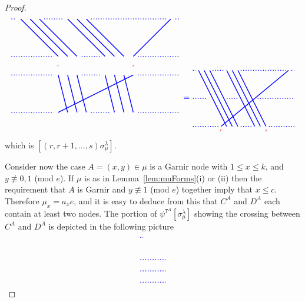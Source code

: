 \documentclass[twoside,11pt,reqno,letter]{amsart}
\numberwithin{equation}{section}
\theoremstyle{definition}  %
\newcommand{\0}{{\bar 0}}
\newcommand{\1}{{\bar 1}}
\newcommand{\la}{\lambda}
\newcommand{\si}{\sigma}
\def\T{{\mathtt T}}
\newenvironment{braid}{%
  \begin{tikzpicture}[baseline=6mm,blue,line width=1pt, scale=0.4,
                      draw/.append style={rounded corners},
                      every node/.append style={font=\tiny}]%
  }{\end{tikzpicture}
}
\begin{document}
{\begin{proof}
\[\begin{braid}
    \draw[dotted](0,10)--(0.5,10);
    \draw[dotted](0,6)--(4.5,6);
    \draw[dotted](0,4)--(4.5,4);
    \draw[dotted](0,0)--(4.5,0);

    \draw(1,10)--(5,6); \draw(5,5)node[color=red]{$r$}; \draw(5,4)--(6,0);
    \draw(2,10)--(6,6); \draw(6,4)--(7,0);
    \draw(3,10)--(7,6); \draw(7,4)--(8,0);

    \draw[dotted](3.5,10)--(5.5,10);
    \draw[dotted](7.5,6)--(9.5,6);
    \draw[dotted](7.5,4)--(9.5,4);
    \draw[dotted](8.5,0)--(10.5,0);

    \draw(6,10)--(10,6); \draw(10,4)--(11,0);
    \draw(7,10)--(11,6); \draw(11,4)--(12,0);
    \draw(8,10)--(12,6); \draw(12,4)--(13,0);

    \draw[dotted](8.5,10)--(16.5,10);

    \draw(17,10)--(13,6); \draw(13,5)node[color=red]{$s$}; \draw(13,4)--(5,0);

    \draw[dotted](17.5,10)--(18,10);
    \draw[dotted](13.5,6)--(18,6);
    \draw[dotted](13.5,4)--(18,4);
    \draw[dotted](13.5,0)--(18,0);
  \end{braid}
  \begin{braid}\tikzset{scale=0.6,baseline=12mm}
    \draw(0,5)node[font=\normalsize]{$=$};
  \end{braid}
  \begin{braid}\tikzset{scale=0.6,baseline=12mm}
    \draw[dotted](0,10)--(0.5,10);
    \draw[dotted](0,5)--(2.5,5);
    \draw[dotted](0,0)--(4.5,0);

    \draw(1,10)--(6,0);
    \draw(2,10)--(7,0);
    \draw(3,10)--(8,0);

    \draw[dotted](3.5,10)--(5.5,10);
    \draw[dotted](6,5)--(8,5);
    \draw[dotted](8.5,0)--(10.5,0);

    \draw(6,10)--(11,0);
    \draw(7,10)--(12,0);
    \draw(8,10)--(13,0)node[below,color=red]{$s$};

    \draw[dotted](8.5,10)--(16.5,10);

    \draw(17,10)--(5,0)node[below,color=red]{$r$};

    \draw[dotted](17.5,10)--(18,10);
    \draw[dotted](11.5,5)--(18,5);
    \draw[dotted](13.5,0)--(18,0);
  \end{braid}
\]
which is $[(r, r+1, \dots, s) \si^\la_\mu]$.








  Consider now the case $A = (x, y) \in \mu$ is a Garnir node with $1 \leq x \leq k$, and $y \not \equiv 0,1$ (mod $e$). If $\mu$ is as in Lemma~\ref{lem:muForms}(i) or (ii) then the requirement that $A$ is Garnir and $y \not \equiv 1$ (mod $e$) together imply that $x \leq c$. Therefore $\mu_x = a_x e$, and it is easy to deduce from this that $C^A$ and $D^A$ each contain at least two nodes. 
The portion of $\psi^{\T^A} [\si^\la_\mu]$ showing the crossing between $C^A$ and $D^A$ is depicted in the following picture
\[
  \begin{braid}\tikzset{scale=0.6,baseline=12mm}
    \draw[dotted](0,10)--(0.5,10);
    \draw[dotted](0,6)--(4.5,6);
    \draw[dotted](0,4)--(4.5,4);
    \draw[dotted](0,2)--(4.5,2);


\end{braid}\]
\end{proof}}
\end{document}
